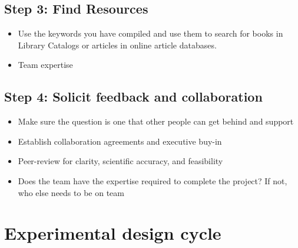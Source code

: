 \documentclass[]{book}
\providecommand{\tightlist}{%
  \setlength{\itemsep}{0pt}\setlength{\parskip}{0pt}}
\begin{document}
\hypertarget{step-3-find-resources}{%
\subsection{Step 3: Find Resources}\label{step-3-find-resources}}

\begin{itemize}
\tightlist
\item
  Use the keywords you have compiled and use them to search for books in Library Catalogs or articles in online article databases.
\item
  Team expertise
\end{itemize}

\hypertarget{step-4-solicit-feedback-and-collaboration}{%
\subsection{Step 4: Solicit feedback and collaboration}\label{step-4-solicit-feedback-and-collaboration}}

\begin{itemize}
\tightlist
\item
  Make sure the question is one that other people can get behind and support
\item
  Establish collaboration agreements and executive buy-in
\item
  Peer-review for clarity, scientific accuracy, and feasibility
\item
  Does the team have the expertise required to complete the project? If not, who else needs to be on team
\end{itemize}

\hypertarget{experimental-design-cycle}{%
\section{Experimental design cycle}\label{experimental-design-cycle}}
\end{document}
